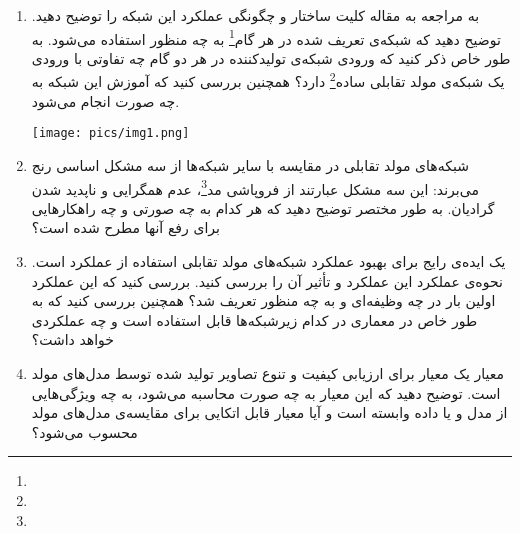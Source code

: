 \begin{enumerate}
	\item
	به مراجعه به مقاله \href{https://arxiv.org/abs/1612.03242}{\textcolor{magenta}{}} کلیت ساختار و چگونگی عملکرد این شبکه را توضیح دهید. توضیح دهید که شبکه‌ی تعریف شده در هر گام\footnote{} به چه منظور استفاده می‌شود. به طور خاص ذکر کنید که ورودی شبکه‌ی تولیدکننده در هر دو گام چه تفاوتی با ورودی یک شبکه‌ی مولد تقابلی ساده\footnote{} دارد؟ همچنین بررسی کنید که آموزش این شبکه به چه صورت انجام می‌شود.
	
	\begin{center}
		\texttt{[image: pics/img1.png]}
		\label{معماری کلی شبکه مولد تقابلی پشته ای}
	\end{center}
	
	\begin{qsolve}
		 
	\end{qsolve}
	
	
	
	
	\item 
شبکه‌های مولد تقابلی در مقایسه با سایر شبکه‌ها از سه مشکل اساسی رنج می‌برند: این سه مشکل عبارتند از فروپاشی مد\footnote{}، عدم همگرایی و ناپدید شدن گرادیان. به طور مختصر توضیح دهید که هر کدام به چه صورتی و چه راهکارهایی برای رفع آنها مطرح شده است؟

	\begin{qsolve}
		
	\end{qsolve}




	
	
	
	
	
	\item 
یک ایده‌ی رایج برای بهبود عملکرد شبکه‌های مولد تقابلی استفاده از عملکرد  است. نحوه‌ی عملکرد این عملکرد و تأثیر آن را بررسی کنید. بررسی کنید که این عملکرد اولین بار در چه وظیفه‌ای و به چه منظور تعریف شد؟ همچنین بررسی کنید که به طور خاص در معماری  در کدام زیرشبکه‌ها قابل استفاده است و چه عملکردی خواهد داشت؟

	\begin{qsolve}
		
	\end{qsolve}
	
	
	
	
	
	
	\item 
معیار  یک معیار برای ارزیابی کیفیت و تنوع تصاویر تولید شده توسط مدل‌های مولد است. توضیح دهید که این معیار به چه صورت محاسبه می‌شود، به چه ویژگی‌هایی از مدل و یا داده وابسته است و آیا معیار قابل اتکایی برای مقایسه‌ی مدل‌های مولد محسوب می‌شود؟
	

\end{enumerate}
